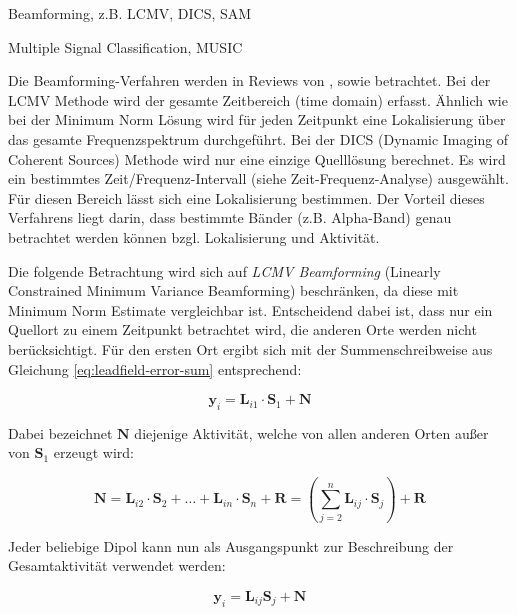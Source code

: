 \documentclass[doc,a4paper,12pt]{apa6}
\newcommand{\mx}[1]{\mathbf{#1}}
\begin{document}
\begin{compactitem}
\item Beamforming, z.B. LCMV, DICS, SAM
\item Multiple Signal Classification, MUSIC
\end{compactitem}

Die Beamforming-Verfahren werden in Reviews von \textcite{hillebrand2005beamformer}, sowie \textcite{hillebrand2005new} betrachtet. Bei der LCMV Methode \parencite{van1997localization} wird der gesamte Zeitbereich (time domain) erfasst. Ähnlich wie bei der Minimum Norm Lösung wird für jeden Zeitpunkt eine Lokalisierung über das gesamte Frequenzspektrum durchgeführt. Bei der DICS (Dynamic Imaging of Coherent Sources) Methode wird nur eine einzige Quelllösung berechnet. Es wird ein bestimmtes Zeit/Frequenz-Intervall (siehe Zeit-Frequenz-Analyse) ausgewählt. Für diesen Bereich lässt sich eine Lokalisierung bestimmen. Der Vorteil dieses Verfahrens liegt darin, dass bestimmte Bänder (z.B. Alpha-Band) genau betrachtet werden können bzgl. Lokalisierung und Aktivität.

Die folgende Betrachtung wird sich auf \emph{LCMV Beamforming} (Linearly Constrained Minimum Variance Beamforming) beschränken, da diese mit Minimum Norm Estimate vergleichbar ist. Entscheidend dabei ist, dass nur ein Quellort zu einem Zeitpunkt betrachtet wird, die anderen Orte werden nicht berücksichtigt. Für den ersten Ort ergibt sich mit der Summenschreibweise aus Gleichung \ref{eq:leadfield-error-sum} entsprechend:

\begin{equation}
\mx{y}_i = \mx{L}_{i1} \cdot \mx{S}_1 + \mx{N}
\end{equation}

Dabei bezeichnet $\mx{N}$ diejenige Aktivität, welche von allen anderen Orten außer von $\mx{S}_1$ erzeugt wird:

\begin{equation}
\mx{N} = \mx{L}_{i2} \cdot \mx{S}_2 + \ldots + \mx{L}_{in} \cdot \mx{S}_n + \mx{R} = \left( \sum_{j=2}^n \mx{L}_{ij} \cdot \mx{S}_j \right) + \mx{R}
\end{equation}

Jeder beliebige Dipol kann nun als Ausgangspunkt zur Beschreibung der Gesamtaktivität verwendet werden:

\begin{equation}
\label{eq:beam}
\mx{y}_i = \mx{L}_{ij} \mx{S}_j + \mx{N}
\end{equation}
\end{document}
